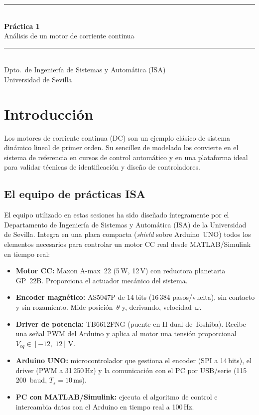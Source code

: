 \documentclass[12pt,a4paper]{article}
\begin{document}

\begin{center}
  \rule{\linewidth}{1.5pt}\\[6pt]
  {\LARGE\bfseries\color{isablue} Práctica 1}\\[6pt]
  {\Large Análisis de un motor de corriente continua}\\[4pt]
  \rule{\linewidth}{1.5pt}\\[8pt]
  {\small Dpto.\ de Ingeniería de Sistemas y Automática (ISA)\\[2pt]
   Universidad de Sevilla}
\end{center}

\vspace{6pt}


\section{Introducción}

Los motores de corriente continua (DC) son un ejemplo clásico de sistema
dinámico lineal de primer orden. Su sencillez de modelado los convierte en
el sistema de referencia en cursos de control automático y en una plataforma
ideal para validar técnicas de identificación y diseño de controladores.

\subsection{El equipo de prácticas ISA}

El equipo utilizado en estas sesiones ha sido diseñado íntegramente por el
Departamento de Ingeniería de Sistemas y Automática (ISA) de la Universidad
de Sevilla. Integra en una placa compacta (\emph{shield} sobre Arduino~UNO)
todos los elementos necesarios para controlar un motor CC real desde
MATLAB/Simulink en tiempo real:

\begin{itemize}[noitemsep]
  \item \textbf{Motor CC:} Maxon A-max~22 (5\,W, 12\,V) con reductora
        planetaria GP~22B.  Proporciona el actuador mecánico del sistema.
  \item \textbf{Encoder magnético:} AS5047P de 14\,bits (16\,384 pasos/vuelta),
        sin contacto y sin rozamiento.  Mide posición~$\theta$ y, derivando,
        velocidad~$\omega$.
  \item \textbf{Driver de potencia:} TB6612FNG (puente en H dual de Toshiba).
        Recibe una señal PWM del Arduino y aplica al motor una tensión
        proporcional $V_{eq}\in[-12,\;12]$\,V.
  \item \textbf{Arduino UNO:} microcontrolador que gestiona el encoder (SPI a
        14\,bits), el driver (PWM a 31\,250\,Hz) y la comunicación con el PC
        por USB/serie (115\,200~baud, $T_s = 10$\,ms).
  \item \textbf{PC con MATLAB/Simulink:} ejecuta el algoritmo de control e
        intercambia datos con el Arduino en tiempo real a 100\,Hz.
\end{itemize}
\end{document}
